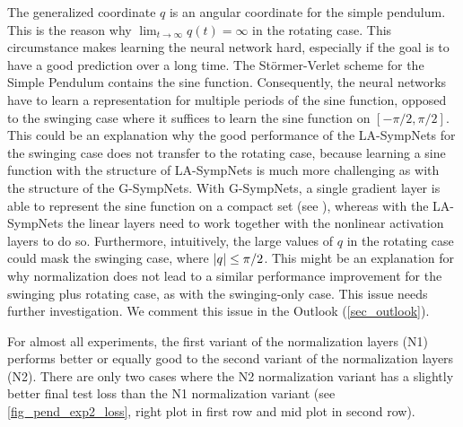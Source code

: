 \documentclass[twoside,a4paper]{article}
\begin{document}
The generalized coordinate $q$ is an angular coordinate for the simple pendulum. 
This is the reason why $\lim_{t \to \infty} q(t) = \infty$
in the rotating case. This circumstance makes learning the neural network hard, especially if the
goal is to have a good prediction over a long time.
The Störmer-Verlet scheme for the Simple Pendulum contains the sine function.
Consequently, the neural networks have to learn a representation for multiple periods of 
the sine function, opposed to the swinging case where it suffices to learn the sine function 
on $[-\pi/2, \pi/2]$. This could be an explanation why the good performance 
of the LA-SympNets for the swinging case does not transfer to the rotating case, because
learning a sine function with the structure of LA-SympNets is much more challenging as with the
structure of the G-SympNets. With G-SympNets, a single gradient layer is able to represent
the sine function on a compact set (see \citet[Lemma 4]{Jin2020}), whereas with the LA-SympNets 
the linear layers need to work together with the nonlinear activation layers to do so.
Furthermore, intuitively, the large values of $q$ in the rotating case could mask the swinging case, 
where $\left|{q}\right| \leq \pi/2$. This might be an explanation for why normalization does not lead to a 
similar performance improvement for the swinging plus rotating case,
as with the swinging-only case. This issue needs further investigation.
We comment this issue in the Outlook (\cref{sec_outlook}).

For almost all experiments, the first variant of the normalization layers (N1) performs better or equally good
to the second variant of the normalization layers (N2). There are only two cases where the N2 normalization variant
has a slightly better final test loss than the N1 normalization variant 
(see \cref{fig_pend_exp2_loss}, right plot in first row and mid plot in second row).
\end{document}
